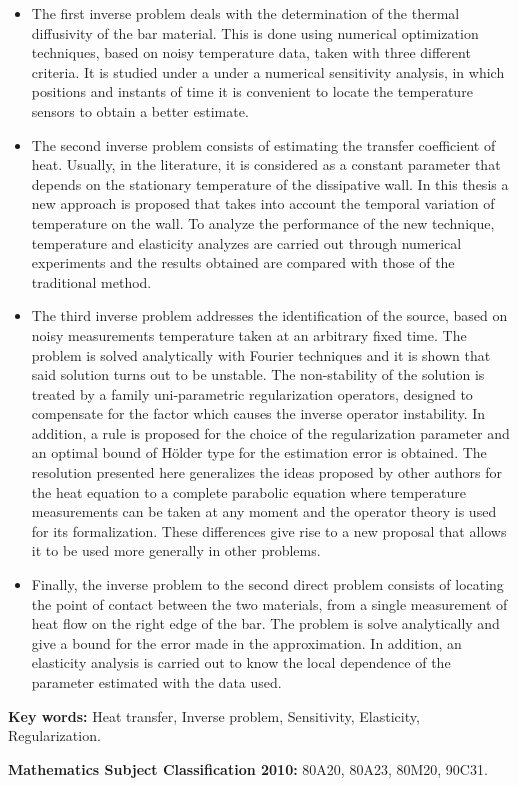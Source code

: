 \begin{itemize}
%
\item The first inverse problem deals with the determination of the thermal diffusivity of the bar material. This is done using numerical optimization techniques, based on noisy temperature data, taken with three different criteria. It is studied under a under a numerical sensitivity analysis, in which positions and instants of time it is convenient to locate the temperature sensors to obtain a better estimate. 
%
\item The second inverse problem consists of estimating the transfer coefficient of heat. Usually, in the literature, it is considered as a constant parameter that depends on the stationary temperature of the dissipative wall. In this thesis  a new approach is proposed that takes into account the temporal variation of temperature on the wall. To analyze the performance of the new technique, temperature and elasticity analyzes are carried out through numerical experiments and the results obtained are compared with those of the traditional method.
%
\item The third inverse problem addresses the identification of the source, based on noisy measurements temperature taken at an arbitrary fixed time. The problem is solved analytically with Fourier techniques and it is shown that said solution turns out to be  unstable. The non-stability of the solution is treated by a family uni-parametric regularization operators, designed to compensate for the factor which causes the inverse operator instability. In addition, a rule is proposed for the choice of the regularization parameter and an optimal bound of H\"older type for the estimation error is obtained. The resolution presented here generalizes the ideas proposed by other authors for the heat equation to a complete parabolic equation where temperature measurements can be taken at any moment and the operator theory is used for its formalization. These differences give rise to a new proposal that allows it to be used more generally in other problems. 
%
\item	Finally, the inverse problem to the second direct problem consists of locating the point of contact between the two materials, from a single measurement of heat flow on the right edge of the bar. The problem is solve analytically and give a bound for the error made in the approximation. In addition, an elasticity analysis is carried out to know the local dependence of the parameter estimated with the data used.
%
\end{itemize}


\hspace{1cm}

\textbf{Key words:} Heat transfer, Inverse problem, Sensitivity, Elasticity, Regularization.

\textbf{Mathematics Subject Classification 2010:} 80A20, 80A23, 80M20, 90C31.
